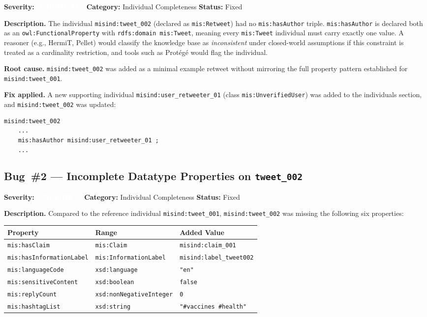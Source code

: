 \documentclass[11pt, a4paper]{article}
\newcommand{\badgeCritical}{\textcolor{white}{\colorbox{severity-critical}{\footnotesize\textbf{\ CRITICAL\ }}}}
\newcommand{\badgeMajor}{\textcolor{white}{\colorbox{severity-major}{\footnotesize\textbf{\ \ MAJOR\ \ }}}}
\newcommand{\prop}[1]{\texttt{mis:#1}}
\newcommand{\ind}[1]{\texttt{misind:#1}}
\begin{document}
\textbf{Severity:} \badgeCritical\quad
\textbf{Category:} Individual Completeness\quad
\textbf{Status:} Fixed

\textbf{Description.}
The individual \ind{tweet\_002} (declared as \texttt{mis:Retweet}) had no
\prop{hasAuthor} triple.
\prop{hasAuthor} is declared both as an \texttt{owl:FunctionalProperty} with
\texttt{rdfs:domain mis:Tweet}, meaning every \texttt{mis:Tweet} individual must
carry exactly one value.
A reasoner (e.g., HermiT, Pellet) would classify the knowledge base as
\emph{inconsistent} under closed-world assumptions if this constraint is treated
as a cardinality restriction, and tools such as Protégé would flag the individual.

\textbf{Root cause.}
\ind{tweet\_002} was added as a minimal example retweet without mirroring the
full property pattern established for \ind{tweet\_001}.

\textbf{Fix applied.}
A new supporting individual \ind{user\_retweeter\_01} (class \texttt{mis:UnverifiedUser})
was added to the individuals section, and \ind{tweet\_002} was updated:

\begin{lstlisting}
misind:tweet_002
    ...
    mis:hasAuthor misind:user_retweeter_01 ;
    ...
\end{lstlisting}

\subsection{Bug~\#2 --- Incomplete Datatype Properties on \texttt{tweet\_002}}
\label{bug:2}

\textbf{Severity:} \badgeMajor\quad
\textbf{Category:} Individual Completeness\quad
\textbf{Status:} Fixed

\textbf{Description.}
Compared to the reference individual \ind{tweet\_001}, \ind{tweet\_002} was
missing the following six properties:

\begin{center}
\renewcommand{\arraystretch}{1.25}
\begin{tabular}{@{} l l l @{}}
\rowcolor{cair-light}
\textbf{Property} & \textbf{Range} & \textbf{Added Value} \\
\midrule
\prop{hasClaim}            & \texttt{mis:Claim}            & \ind{claim\_001} \\
\rowcolor{row-alt}
\prop{hasInformationLabel} & \texttt{mis:InformationLabel} & \ind{label\_tweet002} \\
\prop{languageCode}        & \texttt{xsd:language}         & \texttt{"en"} \\
\rowcolor{row-alt}
\prop{sensitiveContent}    & \texttt{xsd:boolean}          & \texttt{false} \\
\prop{replyCount}          & \texttt{xsd:nonNegativeInteger} & \texttt{0} \\
\rowcolor{row-alt}
\prop{hashtagList}         & \texttt{xsd:string}           & \texttt{"\#vaccines \#health"} \\
\end{tabular}
\end{center}
\end{document}
